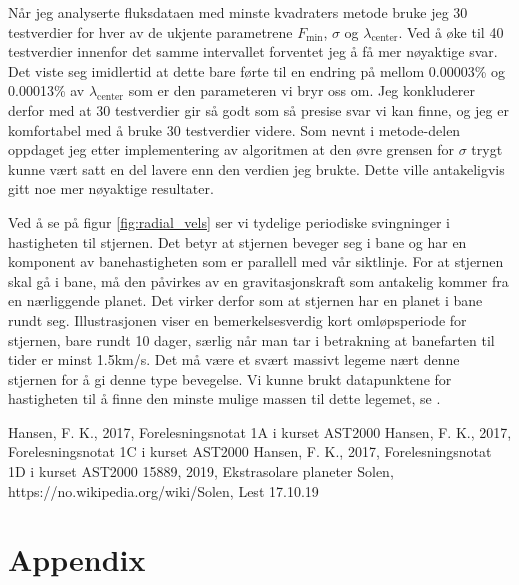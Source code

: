 \documentclass[reprint, english,notitlepage]{revtex4-1}  %
\begin{document}
Når jeg analyserte fluksdataen med minste kvadraters metode bruke jeg 30 testverdier for hver av
 de ukjente parametrene $F_{\text{min}}$, $\sigma$ og $\lambda_{\text{center}}$. Ved å øke til 40 testverdier
 innenfor det samme intervallet forventet jeg å få mer nøyaktige svar. Det viste seg imidlertid
 at dette bare førte til en endring på mellom 0.00003\% og 0.00013\% av $\lambda_{\text{center}}$ som er
 den parameteren vi bryr oss om. Jeg konkluderer derfor med at 30 testverdier gir så godt som så
 presise svar vi kan finne, og jeg er komfortabel med å bruke 30 testverdier videre. Som nevnt i
 metode-delen oppdaget jeg etter implementering av algoritmen at den øvre grensen for $\sigma$
 trygt kunne vært satt en del lavere enn den verdien jeg brukte. Dette ville antakeligvis gitt
 noe mer nøyaktige resultater.

Ved å se på figur \ref{fig:radial_vels} ser vi tydelige periodiske svingninger i hastigheten til
 stjernen. Det betyr at stjernen beveger seg i bane og har en komponent av banehastigheten som er
 parallell med vår siktlinje. For at stjernen skal gå i bane, må den påvirkes av en
 gravitasjonskraft som antakelig kommer fra en nærliggende planet. Det virker derfor som at
 stjernen har en planet i bane rundt seg. Illustrasjonen viser en bemerkelsesverdig kort omløpsperiode for stjernen, bare rundt 10 dager, særlig når man tar i betrakning at banefarten til tider er minst 1.5km/s. Det må være et svært massivt legeme nært denne stjernen for å gi denne type bevegelse. Vi kunne brukt datapunktene for hastigheten til å finne den minste mulige massen til dette legemet, se \citep{paper1C}.




\onecolumngrid
\vspace{1cm} %


\begin{thebibliography}{}
 Hansen, F. K.,  2017, Forelesningsnotat 1A i kurset AST2000
 Hansen, F. K.,  2017, Forelesningsnotat 1C i kurset AST2000
 Hansen, F. K.,  2017, Forelesningsnotat 1D i kurset AST2000
 15889,  2019, Ekstrasolare planeter
 Solen, https://no.wikipedia.org/wiki/Solen, Lest 17.10.19

\end{thebibliography}



\section{Appendix}
\end{document}
